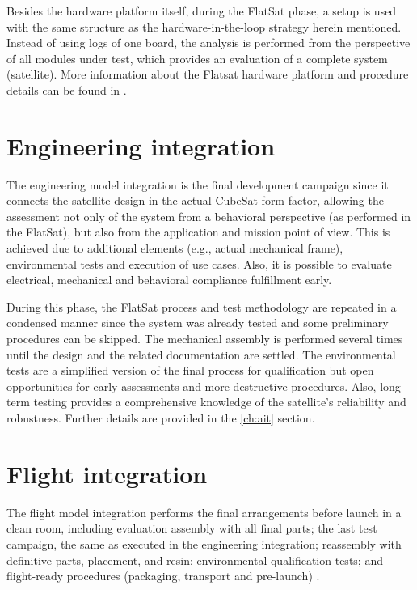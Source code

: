 Besides the hardware platform itself, during the FlatSat phase, a setup is used with the same structure as the hardware-in-the-loop strategy herein mentioned. Instead of using logs of one board, the analysis is performed from the perspective of all modules under test, which provides an evaluation of a complete system (satellite). More information about the Flatsat hardware platform and procedure details can be found in \cite{flatsat}.


\section{Engineering integration}

The engineering model integration is the final development campaign since it connects the satellite design in the actual CubeSat form factor, allowing the assessment not only of the system from a behavioral perspective (as performed in the FlatSat), but also from the application and mission point of view. This is achieved due to additional elements (e.g., actual mechanical frame), environmental tests and execution of use cases. Also, it is possible to evaluate electrical, mechanical and behavioral compliance fulfillment early.

During this phase, the FlatSat process and test methodology are repeated in a condensed manner since the system was already tested and some preliminary procedures can be skipped. The mechanical assembly is performed several times until the design and the related documentation are settled. The environmental tests are a simplified version of the final process for qualification but open opportunities for early assessments and more destructive procedures. Also, long-term testing provides a comprehensive knowledge of the satellite's reliability and robustness. Further details are provided in the \autoref{ch:ait} section.


\section{Flight integration}

The flight model integration performs the final arrangements before launch in a clean room, including evaluation assembly with all final parts; the last test campaign, the same as executed in the engineering integration; reassembly with definitive parts, placement, and resin; environmental qualification tests; and flight-ready procedures (packaging, transport and pre-launch) \cite{marcelino2021}.

